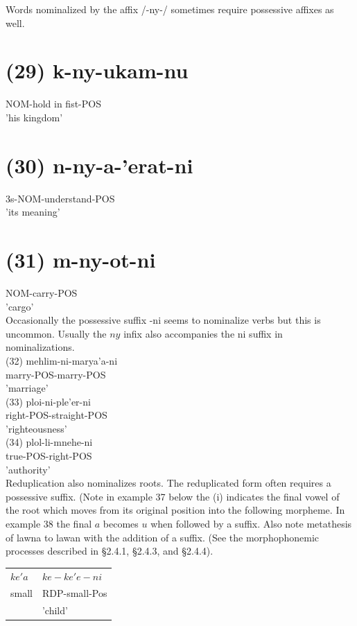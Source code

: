 \documentclass[10pt]{article}
\begin{document}
Words nominalized by the affix /-ny-/ sometimes require possessive affixes as well.

\section*{(29) k-ny-ukam-nu}
NOM-hold in fist-POS\\
'his kingdom'

\section*{(30) n-ny-a-'erat-ni}
3s-NOM-understand-POS\\
'its meaning'

\section*{(31) m-ny-ot-ni}
NOM-carry-POS\\
'cargo'\\
Occasionally the possessive suffix -ni seems to nominalize verbs but this is uncommon. Usually the \(n y\) infix also accompanies the ni suffix in nominalizations.\\
(32) mehlim-ni-marya'a-ni\\
marry-POS-marry-POS\\
'marriage'\\
(33) ploi-ni-ple'er-ni\\
right-POS-straight-POS\\
'righteousness'\\
(34) plol-li-mnehe-ni\\
true-POS-right-POS\\
'authority'\\
Reduplication also nominalizes roots. The reduplicated form often requires a possessive suffix. (Note in example 37 below the (i) indicates the final vowel of the root which moves from its original position into the following morpheme. In example 38 the final \(a\) becomes \(u\) when followed by a suffix. Also note metathesis of lawna to lawan with the addition of a suffix. (See the morphophonemic processes described in §2.4.1, §2.4.3, and §2.4.4).

\begin{center}
\begin{tabular}{ll}
\(k e ' a\) & \(k e-k e ' e-n i\) \\
small & RDP-small-Pos \\
 & 'child' \\
\end{tabular}
\end{center}
\end{document}
